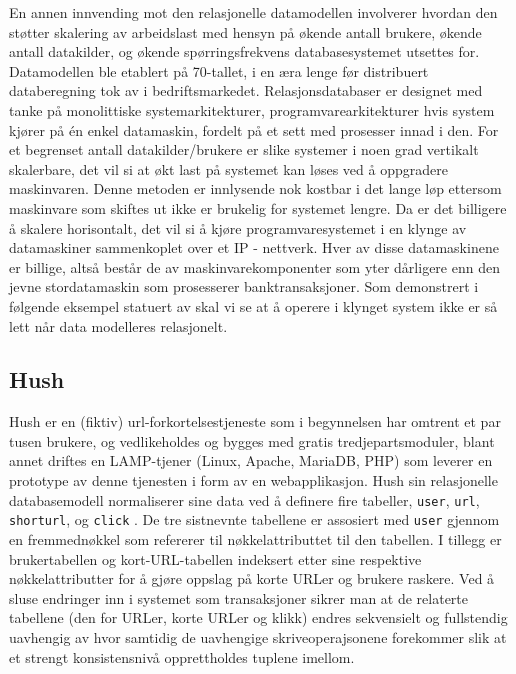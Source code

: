 En annen innvending mot den relasjonelle datamodellen involverer hvordan den støtter skalering av arbeidslast med hensyn på økende antall brukere, økende antall datakilder, og økende spørringsfrekvens databasesystemet utsettes for. Datamodellen ble etablert på 70-tallet, i en æra lenge før distribuert databeregning tok av i bedriftsmarkedet. Relasjonsdatabaser er designet med tanke på monolittiske systemarkitekturer, programvarearkitekturer hvis system kjører på én enkel datamaskin, fordelt på et sett med prosesser innad i den. For et begrenset antall datakilder/brukere er slike systemer i noen grad vertikalt skalerbare, det vil si at økt last på systemet kan løses ved å oppgradere maskinvaren. Denne metoden er innlysende nok kostbar i det lange løp ettersom maskinvare som skiftes ut ikke er brukelig for systemet lengre. Da er det billigere å skalere horisontalt, det vil si å kjøre programvaresystemet i en klynge av datamaskiner sammenkoplet over et IP - nettverk. Hver av disse datamaskinene er billige, altså består de av maskinvarekomponenter som yter dårligere enn den jevne stordatamaskin som prosesserer banktransaksjoner.  Som demonstrert i følgende eksempel statuert av \cite{george2011} skal vi se at å operere i klynget system ikke er så lett når data modelleres relasjonelt.

\subsection{Hush}

Hush er en (fiktiv) url-forkortelsestjeneste som i begynnelsen har omtrent et par tusen brukere, og vedlikeholdes og bygges med gratis tredjepartsmoduler, blant annet driftes en LAMP-tjener (Linux, Apache, MariaDB, PHP) som leverer en prototype av denne tjenesten i form av en webapplikasjon. Hush sin relasjonelle databasemodell normaliserer sine data ved å definere fire tabeller, \texttt{user}, \texttt{url}, \texttt{shorturl}, og \texttt{click} \citep{george2011}. De tre sistnevnte tabellene er assosiert med \texttt{user} gjennom en fremmednøkkel som refererer til nøkkelattributtet til den tabellen. I tillegg er brukertabellen og kort-URL-tabellen indeksert etter sine respektive nøkkelattributter for å gjøre oppslag på korte URLer og brukere raskere. Ved å sluse endringer inn i systemet som transaksjoner sikrer man at de relaterte tabellene (den for URLer, korte URLer og klikk) endres sekvensielt og fullstendig uavhengig av hvor samtidig de uavhengige skriveoperajsonene forekommer slik at et strengt konsistensnivå opprettholdes tuplene imellom.

